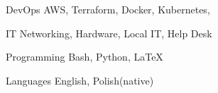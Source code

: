 

\begin{cvskills}

  \cvskill
    {DevOps} %
    {AWS, Terraform, Docker, Kubernetes,} %
    
    
  \cvskill
    {IT} %
    {Networking, Hardware, Local IT, Help Desk} %

  \cvskill
    {Programming} %
    {Bash, Python, LaTeX} %

  \cvskill
    {Languages} %
    {English, Polish(native)} %

\end{cvskills}
